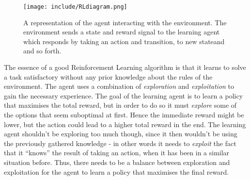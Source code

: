 \documentclass[11pt]{article}
\begin{document}
\begin{figure}[!h]
    \centering
    \texttt{[image: include/RLdiagram.png]}
    \caption{A representation of the agent interacting with the environment.
        The environment sends a state and reward signal to the
    learning agent which responds by taking an action and transition, to new stateand and so forth.}
    \label{fig:agent_environment}
\end{figure}

The essence of a good Reinforcement Learning algorithm is that it learns 
to solve a task satisfactory without any prior knowledge about the rules of the environment.
The agent uses a combination of \textit{exploration} and \textit{exploitation}
to gain the necessary experience.
The goal of the learning agent is to learn a policy that maximises the total reward, but in order to do
so it must \textit{explore} some of the options that seem suboptimal at first.
Hence the immediate reward might be lower, but the action could lead to a higher total reward in the end.
The learning agent shouldn't be exploring too much though, since it then wouldn't
be using the previously gathered knowledge - in other words it needs to
\textit{exploit} the fact that it “knows” the result of taking an action, when it has been in
a similar situation before.
Thus, there needs to be a balance between exploration and exploitation for the
agent to learn a policy that maximises the final reward.
\end{document}
